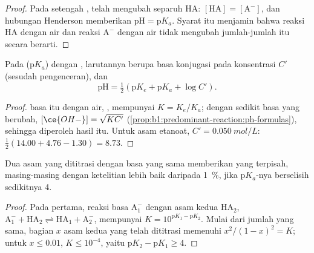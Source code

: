 \begin{proof}
Pada setengah ,  
telah mengubah separuh HA: $[\mathrm{HA}] = [\mathrm{A^-}]$, dan hubungan
Henderson memberikan $\mathrm{pH} = \mathrm{p}K_a$. Syarat itu menjamin
bahwa reaksi HA dengan air dan reaksi $\mathrm{A^-}$ dengan air tidak
mengubah jumlah-jumlah itu secara berarti.
\end{proof}

\begin{proposition}\label{prop:b1:titration-methods:ph-at-equivalence}
Pada    ($\mathrm{p}K_a$) dengan ,
larutannya berupa basa konjugasi pada konsentrasi $C'$ (sesudah
pengenceran), dan
\[
  \mathrm{pH} = \tfrac12(\mathrm{p}K_e + \mathrm{p}K_a + \log C') .
\]
\end{proposition}

\begin{proof}
 basa itu dengan air,
, mempunyai $K = K_e/K_a$; dengan sedikit basa
yang berubah, $[\ce{OH-}] = \sqrt{KC'}$ (\cref{prop:b1:predominant-reaction:ph-formulas}),
sehingga diperoleh hasil itu. Untuk asam etanoat, $C' = \qty{0.050}{mol/L}$:
$\frac12(14.00 + 4.76 - 1.30) = 8.73$.
\end{proof}

\begin{proposition}\label{prop:b1:titration-methods:successive}
Dua asam yang dititrasi dengan basa yang sama memberikan  yang
terpisah, masing-masing dengan ketelitian lebih baik daripada
\qty{1}{\percent}, jika $\mathrm{p}K_a$-nya berselisih sedikitnya 4.
\end{proposition}

\begin{proof}
Pada  pertama, reaksi basa $\mathrm{A_1^-}$ dengan asam kedua
$\mathrm{HA_2}$, $\mathrm{A_1^-} + \mathrm{HA_2}
\rightleftharpoons \mathrm{HA_1} + \mathrm{A_2^-}$, mempunyai $K = 10^{\mathrm{p}K_1 - \mathrm{p}K_2}$.
Mulai dari jumlah yang sama, bagian $x$ asam kedua yang telah dititrasi
memenuhi $x^2/(1 - x)^2 = K$; untuk $x \leqslant 0.01$, $K
\leqslant 10^{-4}$, yaitu $\mathrm{p}K_2 - \mathrm{p}K_1 \geqslant 4$.
\end{proof}

